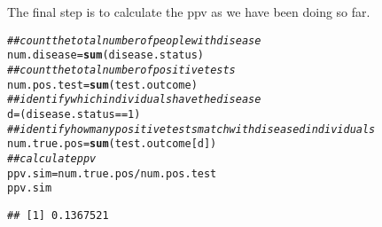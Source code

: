 \documentclass[11pt]{article}\usepackage[]{graphicx}\usepackage[]{color}
\makeatletter
\newcommand{\hlnum}[1]{\textcolor[rgb]{0.686,0.059,0.569}{#1}}%
\newcommand{\hlcom}[1]{\textcolor[rgb]{0.678,0.584,0.686}{\textit{#1}}}%
\newcommand{\hlopt}[1]{\textcolor[rgb]{0,0,0}{#1}}%
\newcommand{\hlstd}[1]{\textcolor[rgb]{0.345,0.345,0.345}{#1}}%
\newcommand{\hlkwb}[1]{\textcolor[rgb]{0.69,0.353,0.396}{#1}}%
\newcommand{\hlkwd}[1]{\textcolor[rgb]{0.737,0.353,0.396}{\textbf{#1}}}%
\newenvironment{kframe}{%
 \def\at@end@of@kframe{}%
 \ifinner\ifhmode%
  \def\at@end@of@kframe{\end{minipage}}%
  \begin{minipage}{\columnwidth}%
 \fi\fi%
 \def\FrameCommand##1{\hskip\@totalleftmargin \hskip-\fboxsep
 \colorbox{shadecolor}{##1}\hskip-\fboxsep
     \hskip-\linewidth \hskip-\@totalleftmargin \hskip\columnwidth}%
 \MakeFramed {\advance\hsize-\width
   \@totalleftmargin\z@ \linewidth\hsize
   \@setminipage}}%
 {\par\unskip\endMakeFramed%
 \at@end@of@kframe}
\newenvironment{knitrout}{}{} %
\makeatother
\begin{document}
The final step is to calculate the ppv as we have been doing so far.  
\begin{knitrout}
\color{fgcolor}\begin{kframe}
\begin{alltt}
\hlcom{## count the total number of people with disease }
\hlstd{num.disease} \hlkwb{=} \hlkwd{sum}\hlstd{(disease.status)}
\hlcom{## count the total number of positive tests }
\hlstd{num.pos.test} \hlkwb{=} \hlkwd{sum}\hlstd{(test.outcome)}
\hlcom{## identify which individuals have the disease}
\hlstd{d} \hlkwb{=} \hlstd{(disease.status} \hlopt{==} \hlnum{1}\hlstd{)}
\hlcom{## identify how many positive tests match with diseased individuals }
\hlstd{num.true.pos} \hlkwb{=} \hlkwd{sum}\hlstd{(test.outcome[d])}
\hlcom{## calculate ppv }
\hlstd{ppv.sim} \hlkwb{=} \hlstd{num.true.pos}\hlopt{/}\hlstd{num.pos.test}
\hlstd{ppv.sim}
\end{alltt}
\begin{verbatim}
## [1] 0.1367521
\end{verbatim}
\end{kframe}
\end{knitrout}
\end{document}

